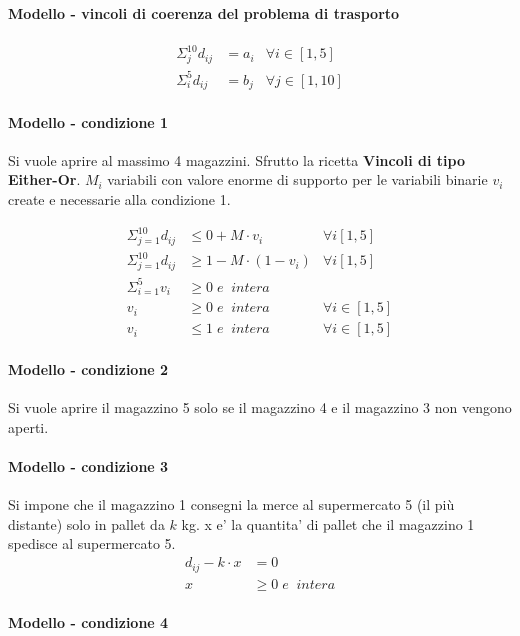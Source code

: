 \documentclass[a4paper,12pt,oneside]{article}
\begin{document}
    \paragraph{Modello - vincoli di coerenza del problema di trasporto}
    \begin{align*}
        \Sigma ^ {10} _ {j} d_{ij} &= a_{i} & \forall i \in [1,5] \\
        \Sigma ^ {5} _ {i} d_{ij} &= b_{j} & \forall j \in [1,10]
    \end{align*}
 
    \paragraph{Modello - condizione 1}
    
    Si vuole aprire al massimo 4 magazzini. Sfrutto la ricetta \textbf{Vincoli di tipo Either-Or}.
    $M_i$ variabili con valore enorme di supporto per le variabili binarie $v_i$ create e necessarie alla condizione 1.
    
    \begin{align*}
        \Sigma ^ {10} _ {j=1} d_{ij} &\leq 0 + M \cdot v_i & \forall i [1,5] \\
        \Sigma ^ {10} _ {j=1} d_{ij} &\geq 1 - M \cdot (1 - v_i) & \forall i [1,5] \\
        \Sigma ^ {5} _ {i=1} v_i &\geq 0 \; e \;\; intera \\
        v_i &\geq 0 \; e \;\; intera & \forall i \in [1,5] \\
        v_i &\leq 1 \; e \;\; intera & \forall i \in [1,5]
    \end{align*}

    \paragraph{Modello - condizione 2}
    Si vuole aprire il magazzino 5 solo se il magazzino 4 e il magazzino 3 non vengono aperti.

    \paragraph{Modello - condizione 3}
    Si impone che il magazzino 1 consegni la merce al supermercato 5 (il più distante) solo in pallet da $k$ kg.
    x e' la quantita' di pallet che il magazzino 1 spedisce al supermercato 5.
    \begin{align*}
        d_{ij} - k \cdot x &= 0 \\
        x &\geq 0 \; e \;\; intera
    \end{align*}

    \paragraph{Modello - condizione 4}
\end{document}
